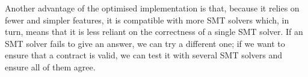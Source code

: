 \documentclass[english,runningheads]{llncs}
\begin{document}
Another advantage of the optimised implementation is that, because
it relies on fewer and simpler features, it is compatible with more
SMT solvers which, in turn, means that it is less reliant on the
correctness of a single SMT solver. If an SMT solver fails to give
an answer, we can try a different one; if we want to ensure that a
contract is valid, we can test it with several SMT solvers and ensure
all of them agree. 



\end{document}
